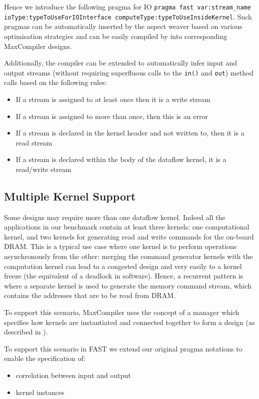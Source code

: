 Hence we introduce the following pragma for IO \texttt{pragma fast
  var:stream\_name ioType:typeToUseForIOInterface
  computeType:typeToUseInsideKernel}. Such pragmas can be
automatically inserted by the aspect weaver based on various
optimisation strategies and can be easily compiled by \fastc{} into
corresponding MaxCompiler designs.

Additionally, the \fastc{} compiler can be extended to automatically
infer input and output streams (without requiring superfluous calls to
the \texttt{in()} and \texttt{out}) method calls based on the following rules:
\begin{itemize}
\item If a stream is assigned to at least once then it is a write stream
\item If a stream is assigned to more than once, then this is an error
\item If a stream is declared in the kernel header and not written
  to, then it is a read stream
\item If a stream is declared within the body of the dataflow
  kernel, it is a read/write stream
\end{itemize}

\subsection{Multiple Kernel Support}

Some designs may require more than one dataflow kernel. Indeed all the
applications in our benchmark contain at least three kernels: one
computational kernel, and two kernels for generating read and write
commands for the on-board DRAM. This is a typical use case where one
kernel is to perform operations asynchronously from the other: merging
the command generator kernels with the computation kernel can lead to
a congested design and very easily to a kernel freeze (the equivalent
of a deadlock in software). Hence, a recurrent pattern is where a
separate kernel is used to generate the memory command stream, which
contains the addresses that are to be read from DRAM.

To support this scenario, MaxCompiler uses the concept of a manager
which specifies how kernels are instantiated and connected together to
form a design (as described in ).

To support this scenario in FAST we extend our original pragma
notations to enable the specification of:
\begin{itemize}
\item correlation between input and output
\item kernel instances
\end{itemize}

